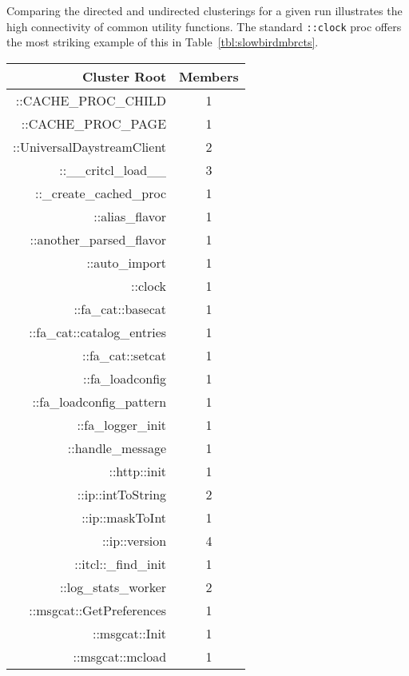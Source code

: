 \documentclass{article}[letter,10pt]
\begin{document}
{{{      Comparing the directed and undirected clusterings for a given run illustrates the high connectivity of common utility functions.
      The standard \texttt{::clock} proc offers the most striking example of this in Table~\ref{tbl:slowbirdmbrcts}.
        \begin{table}[!htbp]
          \begin{subtable}[t]{0.48\textwidth}
            {\footnotesize
            \begin{tabular}[t]{r|c}
              \toprule
              Cluster Root & Members \\
              \midrule
              ::CACHE\_PROC\_CHILD  & 1 \\
              ::CACHE\_PROC\_PAGE  & 1 \\
              ::UniversalDaystreamClient  & 2 \\
              ::\_\_critcl\_load\_\_  & 3 \\
              ::\_create\_cached\_proc  & 1 \\
              ::alias\_flavor  & 1 \\
              ::another\_parsed\_flavor  & 1 \\
              ::auto\_import  & 1 \\
              ::clock  & 1 \\
              ::fa\_cat::basecat  & 1 \\
              ::fa\_cat::catalog\_entries  & 1 \\
              ::fa\_cat::setcat  & 1 \\
              ::fa\_loadconfig  & 1 \\
              ::fa\_loadconfig\_pattern  & 1 \\
              ::fa\_logger\_init  & 1 \\
              ::handle\_message  & 1 \\
              ::http::init  & 1 \\
              ::ip::intToString  & 2 \\
              ::ip::maskToInt  & 1 \\
              ::ip::version  & 4 \\
              ::itcl::\_find\_init  & 1 \\
              ::log\_stats\_worker  & 2 \\
              ::msgcat::GetPreferences  & 1 \\
              ::msgcat::Init  & 1 \\
              ::msgcat::mcload  & 1 \\

\end{tabular}}
\end{subtable}
\end{table}}}}
\end{document}
